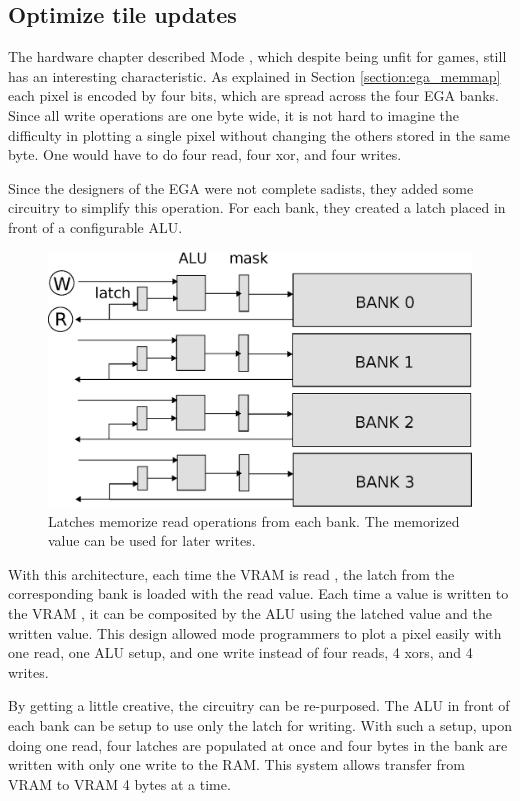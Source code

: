 \documentclass[book.tex]{subfiles}
\begin{document}
\subsection{Optimize tile updates}
\label{section:optimize_tile}
The hardware chapter described Mode , which despite being unfit for games, still has an interesting characteristic. As explained in Section \ref{section:ega_memmap} each pixel is encoded by four bits, which are spread across the four EGA banks. Since all write operations are one byte wide, it is not hard to imagine the difficulty in plotting a single pixel without changing the others stored in the same byte. One would have to do four read, four xor, and four writes.\\
\par
 Since the designers of the EGA were not complete sadists, they added some circuitry to simplify this operation. For each bank, they created a latch placed in front of a configurable ALU.\\
\par
 \begin{figure}[H]
\centering
 \includegraphics[width=\textwidth]{imgs/drawings/latches.eps}
 \caption{Latches memorize read operations from each bank. The memorized value can be used for later writes.}
 \end{figure}
With this architecture, each time the VRAM is read , the latch from the corresponding bank is loaded with the read value. Each time a value is written to the VRAM , it can be composited by the ALU using the latched value and the written value. This design allowed mode  programmers to plot a pixel easily with one read, one ALU setup, and one write instead of four reads, 4 xors, and 4 writes.\\
\par
By getting a little creative, the circuitry can be re-purposed. The ALU in front of each bank can be setup to use only the latch for writing. With such a setup, upon doing one read, four latches are populated at once and four bytes in the bank are written with only one write to the RAM. This system allows transfer from VRAM to VRAM 4 bytes at a time.\\
\par
\begin{minipage}{\textwidth}
  
  \end{minipage}
  \label{ega_latch_copy}
  \par
\end{document}
